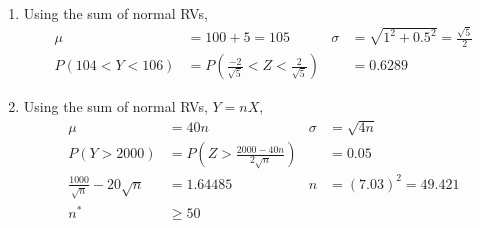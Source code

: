 \begin{enumerate}
    \item Using the sum of normal RVs,
          \begin{align}
              \mu                        & = 100 + 5 = 105                           &
              \sigma                     & = \sqrt{1^2 + 0.5^2} = \frac{\sqrt{5}}{2}   \\
              P(104 < Y < 106)           & = P\left( \frac{-2}{\sqrt{5}} < Z <
              \frac{2}{\sqrt{5}} \right) &
                                         & = 0.6289
          \end{align}

    \item Using the sum of normal RVs, $Y = nX$,
          \begin{align}
              \mu         & = 40n                                      &
              \sigma      & = \sqrt{4n}                                  \\
              P(Y > 2000) & = P\left( Z > \frac{2000 - 40n}{2\sqrt{n}}
              \right)     &
                          & = 0.05                                       \\
              \frac{1000}{\sqrt{n}} - 20\sqrt{n}
                          & = 1.64485                                  &
              n           & = (7.03)^2 = 49.421                          \\
              n^*         & \geq 50
          \end{align}

\end{enumerate}